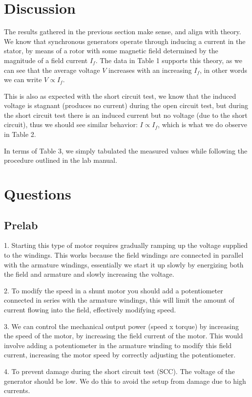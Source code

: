 \documentclass[]{report}
\begin{document}
\section*{Discussion}
The results gathered in the previous section make sense, and align with theory. We know that synchronous generators operate through inducing a current in the stator, by means of a rotor with some magnetic field determined by the magnitude of a field current $I_f$. The data in Table 1 supports this theory, as we can see that the average voltage $V$ increases with an increasing $I_f$, in other words we can write $V \propto I_f$.

This is also as expected with the short circuit test, we know that the induced voltage is stagnant (produces no current) during the open circuit test, but during the short circuit test there is an induced current but no voltage (due to the short circuit), thus we should see similar behavior: $I \propto I_f$, which is what we do observe in Table 2.

In terms of Table 3, we simply tabulated the measured values while following the procedure outlined in the lab manual.

\section*{Questions}

\subsection*{Prelab}

1. Starting this type of motor requires gradually ramping up the voltage supplied to the windings. This works because the field windings are connected in parallel with the armature windings, essentially we start it up slowly by energizing both the field and armature and slowly increasing the voltage.

2. To modify the speed in a shunt motor you should add a potentiometer connected in series with the armature windings, this will limit the amount of current flowing into the field, effectively modifying speed.

3. We can control the mechanical output power (speed x torque) by increasing the speed of the motor, by increasing the field current of the motor. This would involve adding a potentiometer in the armature winding to modify this field current, increasing the motor speed by correctly adjusting the potentiometer.

4. To prevent damage during the short circuit test (SCC). The voltage of the generator should be low. We do this to avoid the setup from damage due to high currents.
\end{document}
